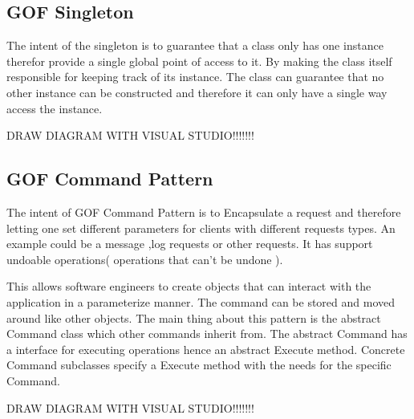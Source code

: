 \subsection{GOF Singleton}
The intent of the singleton is to guarantee that a class only has one instance therefor provide a single global point of access to it. By making the class itself responsible for keeping track of its instance. The class can guarantee that no other instance can be constructed and therefore it can only have a single way access the instance.

DRAW DIAGRAM WITH VISUAL STUDIO!!!!!!!

\subsection{GOF Command Pattern}
The intent of GOF Command Pattern is to Encapsulate a request and therefore letting one set different parameters for clients with different requests types. An example could be a message ,log requests or other requests. It has support undoable operations( operations that can't be undone ).

This allows software engineers to create objects that can interact with the application in a parameterize manner. The command can be stored and moved around like other objects. The main thing about this pattern is the abstract Command class which other commands inherit from. The abstract Command has a interface for executing operations hence an abstract Execute method. Concrete Command subclasses specify a Execute method with the needs for the specific Command.

DRAW DIAGRAM WITH VISUAL STUDIO!!!!!!!